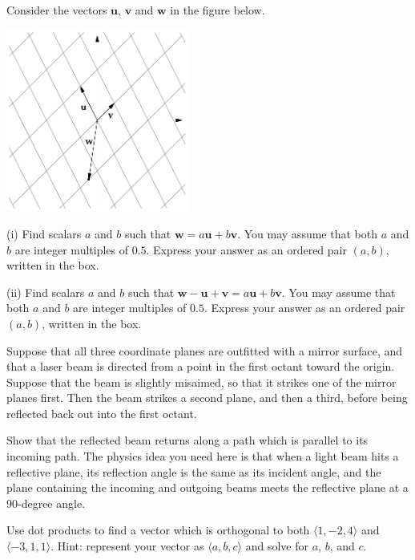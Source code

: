 \documentclass[prettycode,shellescape]{watsonbook}
\begin{document}
\begin{aexercise}
  Consider the vectors $\mathbf{u}$, $\mathbf{v}$ and $\mathbf{w}$ in
  the figure below.

  \begin{center}
    \includegraphics[width=6cm]{exercisefigures/parallelogram}
  \end{center}

  (i) Find scalars $a$ and $b$ such that
  $\mathbf{w} = a\mathbf{u} + b\mathbf{v}$. You may assume that both $a$
  and $b$ are integer multiples of $0.5$. Express your answer as an
  ordered pair $(a,b)$, written in the box.

  (ii) Find scalars $a$ and $b$ such that
  $\mathbf{w} - \mathbf{u} + \mathbf{v} = a\mathbf{u} +
  b\mathbf{v}$. You may assume that both $a$ and $b$ are integer
  multiples of $0.5$. Express your answer as an ordered pair $(a,b)$,
  written in the box.
\end{aexercise}

\begin{aexercise}
  Suppose that all three coordinate planes are outfitted with a mirror
  surface, and that a laser beam is directed from a point in the first
  octant toward the origin. Suppose that the beam is slightly
  misaimed, so that it strikes one of the mirror planes first. Then
  the beam strikes a second plane, and then a third, before being
  reflected back out into the first octant.

  Show that the reflected beam returns along a path which is parallel
  to its incoming path. The physics idea you need here is that when a
  light beam hits a reflective plane, its reflection angle is the same
  as its incident angle, and the plane containing the incoming and
  outgoing beams meets the reflective plane at a 90-degree angle.
\end{aexercise}


\begin{aexercise}
  Use dot products to find a vector which is orthogonal to both
  $\langle 1, -2, 4 \rangle$ and $\langle -3, 1, 1 \rangle$. Hint:
  represent your vector as $\langle a, b, c \rangle$ and solve for
  $a$, $b$, and $c$. 
\end{aexercise}
\end{document}
